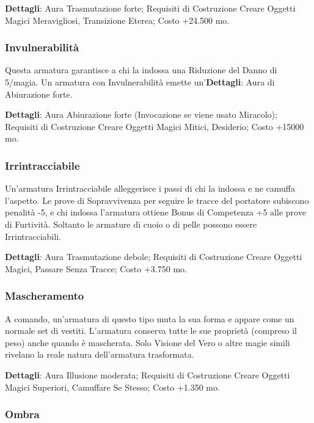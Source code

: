 \begin{multicols}{2}
\textbf{Dettagli}: Aura Trasmutazione forte; Requisiti di Costruzione Creare Oggetti Magici Meravigliosi, Transizione Eterea; Costo +24.500 mo.

\subsubsection{Invulnerabilità}

Questa armatura garantisce a chi la indossa una Riduzione del Danno di 5/magia. Un armatura con Invulnerabilità emette un'\textbf{Dettagli}: Aura di Abiurazione forte.

\textbf{Dettagli}: Aura Abiurazione forte (Invocazione se viene usato Miracolo); Requisiti di Costruzione Creare Oggetti Magici Mitici, Desiderio; Costo +15000 mo.

\subsubsection{Irrintracciabile}

Un'armatura Irrintracciabile alleggerisce i passi di chi la indossa e ne camuffa l'aspetto. Le prove di Sopravvivenza per seguire le tracce del portatore subiscono penalità -5, e chi indossa l'armatura ottiene Bonus di Competenza +5 alle prove di Furtività. Soltanto le armature di cuoio o di pelle possono essere Irrintracciabili.

\textbf{Dettagli}: Aura Trasmutazione debole; Requisiti di Costruzione Creare Oggetti Magici, Passare Senza Tracce; Costo +3.750 mo.

\subsubsection{Mascheramento}

A comando, un'armatura di questo tipo muta la sua forma e appare come un normale set di vestiti. L'armatura conserva tutte le sue proprietà (compreso il peso) anche quando è mascherata. Solo Visione del Vero o altre magie simili rivelano la reale natura dell'armatura trasformata.

\textbf{Dettagli}: Aura Illusione moderata; Requisiti di Costruzione Creare Oggetti Magici Superiori, Camuffare Se Stesso; Costo +1.350 mo.

\subsubsection{Ombra}


\end{multicols}
